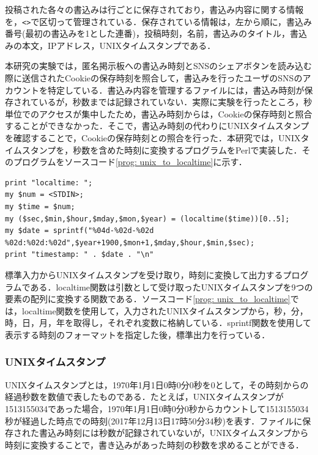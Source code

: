 \documentclass[10pt, a4paper]{jreport}
\begin{document}
投稿された各々の書込みは行ごとに保存されており，書込み内容に関する情報を，\verb|<>|で区切って管理されている．保存されている情報は，左から順に，書込み番号(最初の書込みを1とした連番)，投稿時刻，名前，書込みのタイトル，書込みの本文，IPアドレス，UNIXタイムスタンプである．

本研究の実験では，匿名掲示板への書込み時刻とSNSのシェアボタンを読み込む際に送信されたCookieの保存時刻を照合して，書込みを行ったユーザのSNSのアカウントを特定している．書込み内容を管理するファイルには，書込み時刻が保存されているが，秒数までは記録されていない．実際に実験を行ったところ，秒単位でのアクセスが集中したため，書込み時刻からは，Cookieの保存時刻と照合することができなかった．そこで，書込み時刻の代わりにUNIXタイムスタンプを確認することで，Cookieの保存時刻との照合を行った．本研究では，UNIXタイムスタンプを，秒数を含めた時刻に変換するプログラムをPerlで実装した．そのプログラムをソースコード\ref{prog: unix_to_localtime}に示す．

\begin{lstlisting}[caption=UNIXタイムスタンプ変換プログラム,label=prog: unix_to_localtime]
print "localtime: ";
my $num = <STDIN>;
my $time = $num;
my ($sec,$min,$hour,$mday,$mon,$year) = (localtime($time))[0..5];
my $date = sprintf("%04d-%02d-%02d %02d:%02d:%02d",$year+1900,$mon+1,$mday,$hour,$min,$sec);
print "timestamp: " . $date . "\n"
\end{lstlisting}

標準入力からUNIXタイムスタンプを受け取り，時刻に変換して出力するプログラムである．localtime関数は引数として受け取ったUNIXタイムスタンプを9つの要素の配列に変換する関数である\cite{localtime}．ソースコード\ref{prog: unix_to_localtime}では，localtime関数を使用して，入力されたUNIXタイムスタンプから，秒，分，時，日，月，年を取得し，それぞれ変数に格納している．sprintf関数を使用して表示する時刻のフォーマットを指定した後，標準出力を行っている．

\subsubsection*{UNIXタイムスタンプ}
UNIXタイムスタンプとは，1970年1月1日0時0分0秒を0として，その時刻からの経過秒数を数値で表したものである．たとえば，UNIXタイムスタンプが1513155034であった場合，1970年1月1日0時0分0秒からカウントして1513155034秒が経過した時点での時刻(2017年12月13日17時50分34秒)を表す．ファイルに保存された書込み時刻には秒数が記録されていないが，UNIXタイムスタンプから時刻に変換することで，書き込みがあった時刻の秒数を求めることができる．
\end{document}
